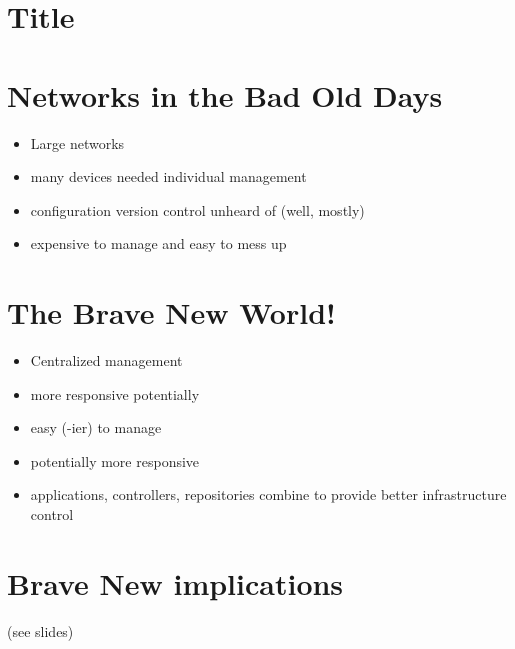 \documentclass[12pt,letterpaper]{article}
\author{Christopher C. Lamb}
\begin{document}
\section{Title}

\section{Networks in the Bad Old Days}
\begin{itemize}
\item Large networks
\item many devices needed individual management
\item configuration version control unheard of (well, mostly)
\item expensive to manage and easy to mess up
\end{itemize}

\section{The Brave New World!}
\begin{itemize}
\item Centralized management
\item more responsive potentially
\item easy (-ier) to manage
\item potentially more responsive
\item applications, controllers, repositories combine to provide better infrastructure control
\end{itemize}

\section{Brave New implications}
(see slides)

\newpage
\end{document}
